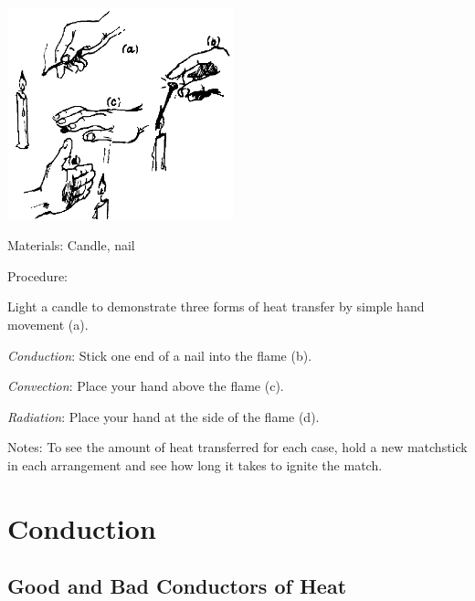 \begin{multicols}{2}
\begin{center}
\includegraphics[width=0.49\textwidth]{./img/source/heat-trans-candle.png}
\end{center}

\begin{description*}
\item[Materials:]{Candle, nail}
\item[Procedure:]{Light a candle to demonstrate three forms of heat transfer by simple hand movement (a). 

\emph{Conduction}: Stick one end of a nail into the flame (b). 

\emph{Convection}: Place your hand above the flame (c). 

\emph{Radiation}: Place your hand at the side of the flame (d).}
\item[Notes:]{To see the amount of heat transferred for each case, hold a new matchstick in each arrangement and see how long it takes to ignite the match.}
\end{description*}


\section*{Conduction}


\subsection{Good and Bad Conductors of Heat}


\end{multicols}
